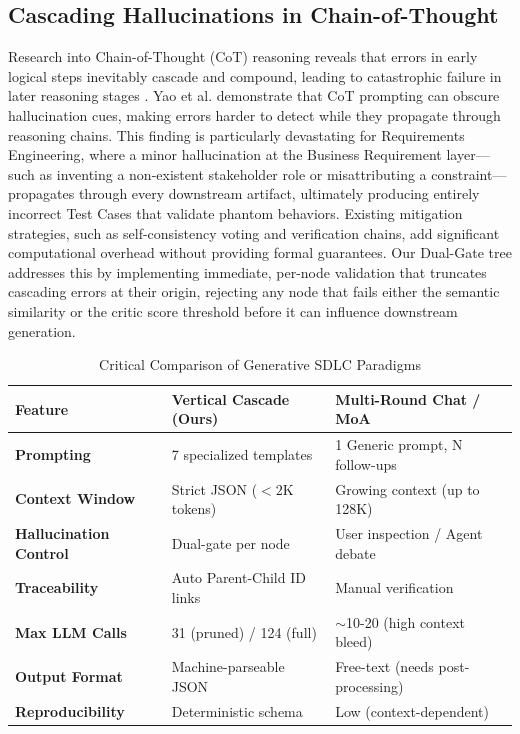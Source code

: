 \documentclass[journal]{IEEEtran}
\begin{document}
\subsection{Cascading Hallucinations in Chain-of-Thought}
Research into Chain-of-Thought (CoT) reasoning reveals that errors in early logical steps inevitably cascade and compound, leading to catastrophic failure in later reasoning stages \cite{cascading_hallucination2024}. Yao et al. demonstrate that CoT prompting can obscure hallucination cues, making errors harder to detect while they propagate through reasoning chains. This finding is particularly devastating for Requirements Engineering, where a minor hallucination at the Business Requirement layer---such as inventing a non-existent stakeholder role or misattributing a constraint---propagates through every downstream artifact, ultimately producing entirely incorrect Test Cases that validate phantom behaviors. Existing mitigation strategies, such as self-consistency voting and verification chains, add significant computational overhead without providing formal guarantees. Our Dual-Gate tree addresses this by implementing immediate, per-node validation that truncates cascading errors at their origin, rejecting any node that fails either the semantic similarity or the critic score threshold before it can influence downstream generation.

\begin{table}[ht]
\centering
\caption{Critical Comparison of Generative SDLC Paradigms}
\label{tab:comparison}
\begin{tabular}{@{}p{2.2cm}p{2.8cm}p{2.8cm}@{}}
\toprule
\textbf{Feature} & \textbf{Vertical Cascade (Ours)} & \textbf{Multi-Round Chat / MoA} \\ \midrule
\textbf{Prompting} & 7 specialized templates & 1 Generic prompt, N follow-ups \\
\textbf{Context Window} & Strict JSON ($< 2$K tokens) & Growing context (up to 128K) \\
\textbf{Hallucination Control} & Dual-gate per node & User inspection / Agent debate \\
\textbf{Traceability} & Auto Parent-Child ID links & Manual verification \\
\textbf{Max LLM Calls} & 31 (pruned) / 124 (full) & $\sim$10-20 (high context bleed) \\
\textbf{Output Format} & Machine-parseable JSON & Free-text (needs post-processing) \\
\textbf{Reproducibility} & Deterministic schema & Low (context-dependent) \\
\bottomrule
\end{tabular}
\end{table}
\end{document}
